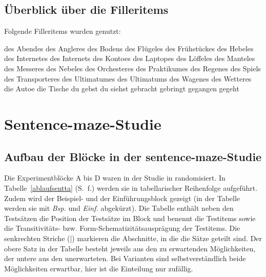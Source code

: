 \section{Überblick über die Filleritems}
\label{fillerlex}

Folgende Filleritems wurden genutzt: 

\begin{multicols}{3}
\ea des Abendes
\ex des Angleres
\ex des Bodens
\ex des Flügeles
\ex des Frühstückes
\ex des Hebeles
\ex des Internetes
\ex des Internets
\ex des Kontoes
\ex des Laptopes
\ex des Löffeles
\ex des Manteles
\ex des Messeres
\ex des Nebeles
\ex des Orchesteres
\ex des Praktikumes
\ex des Regenes
\ex des Spiels
\ex des Transporteres
\ex des Ultimatumes
\ex des Ultimatums
\ex des Wagenes
\ex des Wetteres
\ex die Autoe
\ex die Tische
\ex du gebst
\ex du siehst
\ex gebracht
\ex gebringt
\ex gegangen
\ex gegeht
\z
\end{multicols}

\chapter{Sentence-maze-Studie}
\label{Anhangmatsent}


\section{Aufbau der Blöcke in der sentence-maze-Studie}
\label{blocksent}

Die Experimentblöcke A bis D waren in der Studie in randomisiert. In Tabelle~\ref{ablaufsentta} (S.~\pageref{ablaufsentta}f.) werden sie in tabellarischer Reihenfolge aufgeführt. Zudem wird der Beispiel- und der Einführungsblock gezeigt (in der Tabelle werden sie mit \textit{Bsp.} und \textit{Einf.} abgekürzt). Die Tabelle enthält neben den Testsätzen die Position der Testsätze im Block und benennt die Testitems sowie die Transitivitäts- bzw. Form-Sche\-ma\-ti\-zi\-täts\-aus\-prä\-gung der Testitems. Die senkrechten Striche (|) markieren die Abschnitte, in die die Sätze geteilt sind. Der obere Satz in der Tabelle besteht jeweils aus den zu erwartenden Möglichkeiten, der untere aus den unerwarteten. Bei Varianten sind selbstverständlich beide Möglichkeiten erwartbar, hier ist die Einteilung nur zufällig. 


